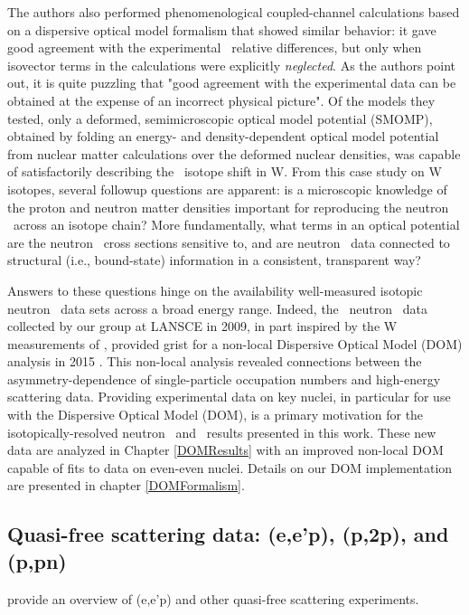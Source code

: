 The authors also performed phenomenological coupled-channel calculations
based on a dispersive optical model formalism
\cite{Mahaux1991} that showed similar behavior: it gave good agreement with the
experimental \tot\ relative differences, but only when isovector terms in the calculations
were explicitly \textit{neglected}. As the
authors point out, it is quite puzzling that "good agreement with the
experimental data can be obtained at the expense of an incorrect physical picture".
Of the models they tested, only a deformed, semimicroscopic
optical model potential (SMOMP),
obtained by folding an energy- and density-dependent optical model potential from nuclear matter 
calculations over the deformed nuclear densities, was capable of satisfactorily describing the
\tot\ isotope shift in W. From this case study on W isotopes, several followup questions
are apparent: is a microscopic knowledge of the proton and neutron matter
densities important for reproducing the neutron \tot\ across an isotope
chain? More fundamentally, what terms in an optical potential are the neutron
\tot\ cross sections sensitive to, and are neutron \tot\ data connected to
structural (i.e., bound-state) information in a consistent, transparent way?

Answers to these questions hinge on the availability well-measured 
isotopic neutron \tot\ data sets across a broad energy range. Indeed, the
\caAughtEight\ neutron \tot\ data collected by our group at LANSCE in 2009, in
part inspired by the W measurements of \cite{Dietrich2003},
provided grist for a non-local Dispersive Optical Model (DOM) analysis in 2015
\cite{MahzoonPhDThesis}. This non-local analysis revealed connections
between the asymmetry-dependence of single-particle occupation numbers
and high-energy scattering data.
Providing experimental data on key nuclei, in particular for use with the Dispersive Optical Model
(DOM), is a primary motivation for the isotopically-resolved neutron \tot\ and \el\
results presented in this work. These new data are analyzed in Chapter \ref{DOMResults} 
with an improved non-local DOM capable of fits to data on even-even nuclei. Details on our DOM
implementation are presented in chapter \ref{DOMFormalism}. 

\subsection{Quasi-free scattering data: (e,e'p), (p,2p), and (p,pn)}
\cite{Mougey1980, Jacob1966, Jacob1973} provide an overview of (e,e'p) and other quasi-free 
scattering experiments.


